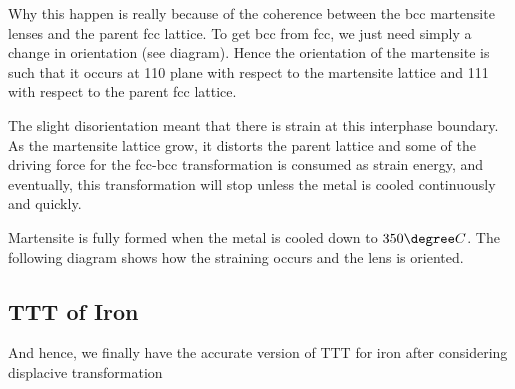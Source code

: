 Why this happen is really because of the coherence between the bcc martensite lenses and the parent fcc lattice. To get bcc from fcc, we just need simply a change in orientation (see diagram). Hence the orientation of the martensite is such that it occurs at {110} plane with respect to the martensite lattice and {111} with respect to the parent fcc lattice.


The slight disorientation meant that there is strain at this interphase boundary. As the martensite lattice grow, it distorts the parent lattice and some of the driving force for the fcc-bcc transformation is consumed as strain energy, and eventually, this transformation will stop unless the metal is cooled continuously and quickly.

Martensite is fully formed when the metal is cooled down to $350\degree C$. The following diagram shows how the straining occurs and the lens is oriented.



\subsection{TTT of Iron} %
\label{sub:ttt_of_iron}

And hence, we finally have the accurate version of TTT for iron after considering displacive transformation




